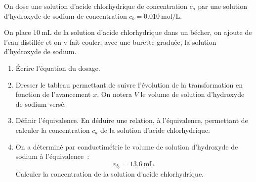 On dose une solution d'acide chlorhydrique de concentration $c_{a}$ par une
solution d'hydroxyde de sodium de concentration
$c_{b}=\qty{0.010}{\mol\per\L}$.

On place $\qty{10}{\mL}$ de la solution d'acide chlorhydrique dans un bécher, on
ajoute de l'eau distillée et on y fait couler, avec une burette graduée, la
solution d'hydroxyde de sodium.
\begin{enumerate}
    \item Écrire l'équation du dosage.
    \item Dresser le tableau permettant de suivre l'évolution de la
          transformation en fonction de l'avancement $x$. On notera $V$ le
          volume de solution d'hydroxyde de sodium versé.
    \item Définir l'équivalence. En déduire une relation, à l'équivalence,
          permettant de calculer la concentration $c_{a}$ de la solution d'acide
          chlorhydrique.
    \item On a déterminé par conductimétrie le volume de solution d'hydroxyde de
          sodium à l'équivalence~:
          \[
              v_{b_{e}}=\qty{13.6}{\mL}.
          \]
          Calculer la concentration de la solution d'acide chlorhydrique.
\end{enumerate}

